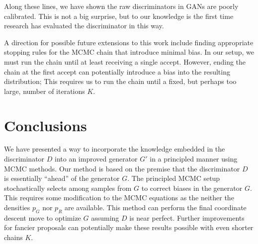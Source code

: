 \documentclass{article}
\newcommand{\PG}{{p_G}}
\newcommand{\PR}{{p_R}}
\begin{document}
Along these lines, we have shown the raw discriminators in GANs are poorly calibrated.
This is not a big surprise, but to our knowledge is the first time research has evaluated the discriminator in this way.

A direction for possible future extensions to this work include finding appropriate stopping rules for the MCMC chain that introduce minimal bias.
In our setup, we must run the chain until at least receiving a single accept.
However, ending the chain at the first accept can potentially introduce a bias into the resulting distribution; This requires us to run the chain until a fixed, but perhaps too large, number of iterations $K$.

\section{Conclusions}
\label{sec:Conclusions}

We have presented a way to incorporate the knowledge embedded in the discriminator $D$ into an improved generator $G'$ in a principled manner using MCMC methods.
Our method is based on the premise that the discriminator $D$ is essentially ``ahead'' of the generator $G$.
The principled MCMC setup stochastically selects among samples from $G$ to correct biases in the generator $G$.
This requires some modification to the MCMC equations as the neither the densities $\PG$ nor $\PR$ are available.
This method can perform the final coordinate descent move to optimize $G$ assuming $D$ is near perfect.
Further improvements for fancier proposals can potentially make these results possible with even shorter chains $K$.


\end{document}
